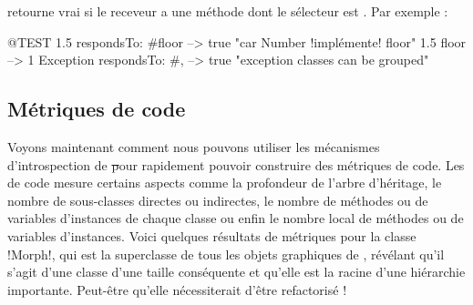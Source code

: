 \documentclass[a4paper,10pt,twoside]{book}
\begin{document}
 retourne vrai si le receveur a une méthode dont le sélecteur est .
Par exemple :
\begin{code}{@TEST}
1.5 respondsTo: #floor      --> true    "car Number !implémente! floor"
1.5 floor                            --> 1
Exception respondsTo: #, --> true    "exception classes can be grouped"
\end{code}



\subsection{Métriques de code}

Voyons maintenant comment nous pouvons utiliser les mécanismes d'introspection de \st pour rapidement pouvoir construire des métriques de code. Les  de code mesure certains aspects comme la profondeur de l'arbre d'héritage, le nombre de sous-classes directes ou indirectes, le nombre de méthodes ou de variables d'instances de chaque classe ou enfin le nombre local de méthodes ou de variables d'instances.
Voici quelques résultats de métriques pour la classe \ct!Morph!, qui est la superclasse de tous les objets graphiques de \pharo, révélant qu'il s'agit d'une classe d'une taille conséquente et qu'elle est la racine d'une hiérarchie importante. Peut-être qu'elle nécessiterait d'être refactorisé !
\end{document}
